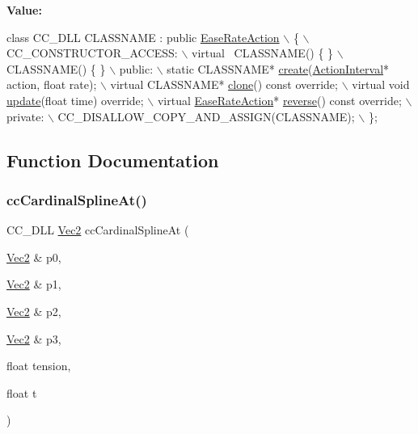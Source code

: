 {\bfseries Value\+:}
\begin{DoxyCode}
\textcolor{keyword}{class }CC\_DLL CLASSNAME : \textcolor{keyword}{public} \hyperlink{classEaseRateAction}{EaseRateAction} \(\backslash\)
\{ \(\backslash\)
CC\_CONSTRUCTOR\_ACCESS: \(\backslash\)
    virtual ~CLASSNAME() \{ \} \(\backslash\)
    CLASSNAME() \{ \} \(\backslash\)
public: \(\backslash\)
    static CLASSNAME* \hyperlink{classEaseRateAction_a94d1d8c5c219f82bbb15e31eea82ef99}{create}(\hyperlink{classActionInterval}{ActionInterval}* action, \textcolor{keywordtype}{float} rate); \(\backslash\)
    virtual CLASSNAME* \hyperlink{classEaseRateAction_a50323a94f7587203d7b02bb66fe2e67e}{clone}() \textcolor{keyword}{const override}; \(\backslash\)
    virtual \textcolor{keywordtype}{void} \hyperlink{classActionEase_a77679f09c02cf75fb54776470c339fc5}{update}(\textcolor{keywordtype}{float} time) \textcolor{keyword}{override}; \(\backslash\)
    virtual \hyperlink{classEaseRateAction}{EaseRateAction}* \hyperlink{classEaseRateAction_acd2b87a3358e01fa74a726634dcd41fb}{reverse}() \textcolor{keyword}{const override}; \(\backslash\)
private: \(\backslash\)
    CC\_DISALLOW\_COPY\_AND\_ASSIGN(CLASSNAME); \(\backslash\)
\};
\end{DoxyCode}


\subsection{Function Documentation}
\mbox{\label{group__actions_gac368291f4754e4c1b34fec023a30dd23}} 
\subsubsection{\texorpdfstring{cc\+Cardinal\+Spline\+At()}{ccCardinalSplineAt()}\hspace{0.1cm}{\footnotesize\ttfamily [1/2]}}
{\footnotesize\ttfamily C\+C\+\_\+\+D\+LL \hyperlink{classVec2}{Vec2} cc\+Cardinal\+Spline\+At (\begin{DoxyParamCaption}\item[{\hyperlink{classVec2}{Vec2} \&}]{p0,  }\item[{\hyperlink{classVec2}{Vec2} \&}]{p1,  }\item[{\hyperlink{classVec2}{Vec2} \&}]{p2,  }\item[{\hyperlink{classVec2}{Vec2} \&}]{p3,  }\item[{float}]{tension,  }\item[{float}]{t }\end{DoxyParamCaption})}

